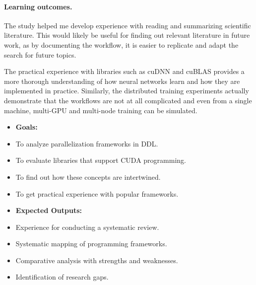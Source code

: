 \paragraph{Learning outcomes.}
The study helped me develop experience with reading and summarizing scientific literature. 
This would likely be useful for finding out relevant literature in future work, as by documenting
the workflow, it is easier to replicate and adapt the search for future topics.

The practical experience with libraries such as cuDNN and cuBLAS provides a more thorough
understanding of how neural networks learn and how they are implemented in practice. Similarly,
the distributed training experiments actually demonstrate that the workflows are not at all complicated
and even from a single machine, multi-GPU and multi-node training can be simulated.



\begin{itemize}
	\item \textbf{Goals:}
	\item To analyze parallelization frameworks in DDL.
	\item To evaluate libraries that support CUDA programming.
	\item To find out how these concepts are intertwined.
	\item To get practical experience with popular frameworks. \\
	\item \textbf{Expected Outputs:}
	\item Experience for conducting a systematic review.
	\item Systematic mapping of programming frameworks.
	\item Comparative analysis with strengths and weaknesses.
	\item Identification of research gaps. \\
\end{itemize}

